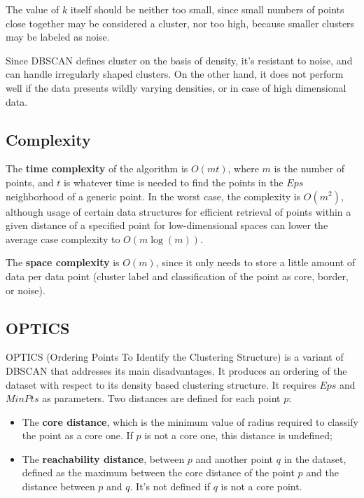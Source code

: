 The value of $k$ itself should be neither too small, since small numbers of points close together may be considered a cluster, nor too high, because smaller clusters may be labeled as noise.

Since DBSCAN defines cluster on the basis of density, it's resistant to noise, and can handle irregularly shaped clusters. On the other hand, it does not perform well if the data presents wildly varying densities, or in case of high dimensional data.

\subsection{Complexity}

The \textbf{time complexity} of the algorithm is $O(m t)$, where $m$ is the number of points, and $t$ is whatever time is needed to find the points in the $Eps$ neighborhood of a generic point. In the worst case, the complexity is $O(m^2)$, although usage of certain data structures for efficient retrieval of points within a given distance of a specified point for low-dimensional spaces can lower the average case complexity to $O(m \log(m))$.

The \textbf{space complexity} is $O(m)$, since it only needs to store a little amount of data per data point (cluster label and classification of the point as core, border, or noise).

\subsection{OPTICS}

OPTICS (Ordering Points To Identify the Clustering Structure) is a variant of DBSCAN that addresses its main disadvantages. It produces an ordering of the dataset with respect to its density based clustering structure. It requires $Eps$ and $MinPts$ as parameters. Two distances are defined for each point $p$:
\begin{itemize}
    \item The \textbf{core distance}, which is the minimum value of radius required to classify the point as a core one. If $p$ is not a core one, this distance is undefined;

    \item The \textbf{reachability distance}, between $p$ and another point $q$ in the dataset, defined as the maximum between the core distance of the point $p$ and the distance between $p$ and $q$. It's not defined if $q$ is not a core point.
\end{itemize}

